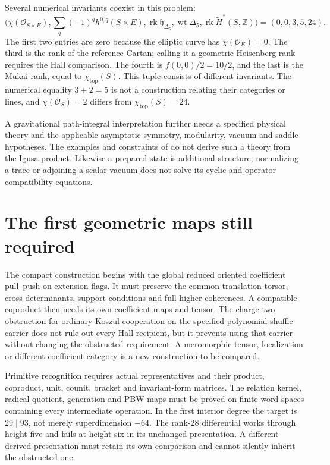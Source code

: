 Several numerical invariants coexist in this problem:
\[
 \bigl(\chi(\mathcal O_{S\times E}),
       \sum_q(-1)^qh^{0,q}(S\times E),
       \operatorname{rk}\mathfrak h_{\Delta_5},
       \operatorname{wt}\Delta_5,
       \operatorname{rk}\widetilde H^*(S,\mathbb Z)\bigr)
       =(0,0,3,5,24).
\]
The first two entries are zero because the elliptic curve has
\(\chi(\mathcal O_E)=0\). The third is the rank of the
reference Cartan; calling it a geometric Heisenberg rank requires
the Hall comparison. The fourth is \(f(0,0)/2=10/2\), and
the last is the Mukai rank, equal to \(\chi_{\mathrm{top}}(S)\).
This tuple consists of different invariants. The numerical equality
\(3+2=5\) is not a construction relating their categories or
lines, and \(\chi(\mathcal O_S)=2\) differs from
\(\chi_{\mathrm{top}}(S)=24\).

A gravitational path-integral interpretation further needs a
specified physical theory and the applicable asymptotic symmetry,
modularity, vacuum and saddle hypotheses. The examples and
constraints of \cite{HM} do not derive such a theory from the
Igusa product. Likewise a prepared state is additional structure;
normalizing a trace or adjoining a scalar vacuum does not solve
its cyclic and operator compatibility equations.

\section{The first geometric maps still required}

The compact construction begins with the global reduced oriented
coefficient pull--push on extension flags. It must preserve the
common translation torsor, cross determinants, support conditions
and full higher coherences. A compatible coproduct then needs its
own coefficient maps and tensor. The charge-two obstruction for
ordinary-Koszul cooperation on the specified polynomial shuffle
carrier does not rule out every Hall recipient, but it prevents
using that carrier without changing the obstructed requirement.
A meromorphic tensor, localization or different coefficient
category is a new construction to be compared.

Primitive recognition requires actual representatives and their
product, coproduct, unit, counit, bracket and invariant-form
matrices. The relation kernel, radical quotient, generation and
PBW maps must be proved on finite word spaces containing every
intermediate operation. In the first interior degree the target
is \(29\mid93\), not merely superdimension \(-64\).
The rank-28 differential works through height five and fails at
height six in its unchanged presentation. A different derived
presentation must retain its own comparison and cannot silently
inherit the obstructed one.

